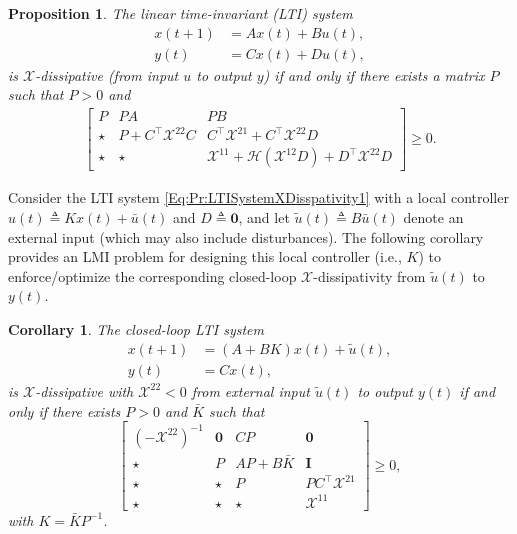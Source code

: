 \documentclass[letterpaper, 10 pt, conference]{ieeeconf}%
\newcommand{\T}{\top}
\newcommand{\I}{\mathbf{I}}
\newcommand{\0}{\mathbf{0}}
\newcommand{\X}{\mathcal{X}}
\newcommand{\bm}[1]{\begin{bmatrix}#1\end{bmatrix}}
\newtheorem{corollary}{\textbf{Corollary}}
\newtheorem{proposition}{\textbf{Proposition}}
\begin{document}
\begin{proposition}\label{Pr:LTISystemXDisspativity}
\cite{Welikala2025Ax1} The linear time-invariant (LTI) system
\begin{equation}\label{Eq:Pr:LTISystemXDisspativity1}
\begin{aligned}
    x(t+1) &= A x(t) + B u(t),\\
    y(t) &= Cx(t) +Du(t),
\end{aligned}
\end{equation}
is $\X$-dissipative (from input $u$ to output $y$) if and only if there exists a matrix $P$ such that $P>0$ and 
\begin{equation}
\nonumber
\begin{aligned}
\label{Eq:Pr:LTISystemXDisspativity2}
\bm{
P & PA & PB \\
\star & P + C^\T \X^{22} C & C^\T \X^{21} + C^\T \X^{22} D\\
\star & \star & \X^{11} + \mathcal{H}(\X^{12} D) + D^\T \X^{22}D
}
\geq 0.
\end{aligned}
\end{equation}
\end{proposition}


Consider the LTI system \eqref{Eq:Pr:LTISystemXDisspativity1} with a local controller $u(t) \triangleq Kx(t) + \bar{u}(t)$ and $D\triangleq \0$, and let $\tilde{u}(t) \triangleq B\bar{u}(t)$ denote an external input (which may also include disturbances). The following corollary provides an LMI problem for designing this local controller (i.e., $K$) to enforce/optimize the corresponding closed-loop $\X$-dissipativity from $\tilde{u}(t)$ to $y(t)$. 

\begin{corollary}\label{Co:LTISystemXDisspativation}
\cite{Welikala2025Ax1} The closed-loop LTI system
\begin{equation}\label{Eq:Co:LTISystemXDisspativation1}
\begin{aligned}
x(t+1) &= (A+BK)x(t) + \tilde{u}(t),\\
y(t) &= Cx(t),   
\end{aligned}
\end{equation}
is $\X$-dissipative with $\X^{22}<0$ from external input $\tilde{u}(t)$ to output $y(t)$ if and only if there exists $P>0$ and $\bar{K}$ such that  
\begin{equation}
\nonumber 
\bm{ 
(-\X^{22})^{-1} & \0 & CP & \0 \\
\star & P & AP+B\bar{K} & \I \\
\star & \star & P  & PC^\top \X^{21}\\
\star & \star & \star & \X^{11}} \geq 0,
\end{equation}  
with $K=\bar{K}P^{-1}$.
\end{corollary}
\end{document}
